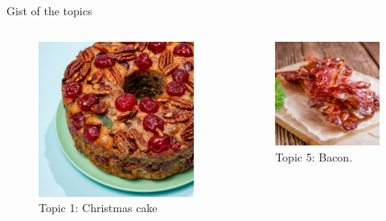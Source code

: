 \documentclass{beamer}
\begin{document}
\begin{frame}{Gist of the topics}
\begin{adjustbox}{max totalsize={.9\textwidth}{.7\textheight},center}
		\end{adjustbox}
\begin{columns}
	\begin{column}{0.5\textwidth}
		\begin{figure}
		\includegraphics[scale = 0.04]{christmas_cake}
		\caption{Topic 1: Christmas cake}
		\end{figure}
		\end{column}
	\begin{column}{0.5\textwidth}
			\begin{figure}
		\includegraphics[scale = 0.14]{bacon}
		\caption{Topic 5: Bacon. }
	\end{figure}
	\end{column}
\end{columns}
	

\end{frame}
\end{document}
